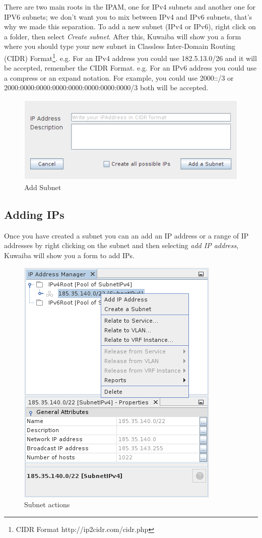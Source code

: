 \documentclass[a4paper]{article}
\begin{document}
		There are two main roots in the IPAM, one for IPv4 subnets and another one for IPV6 subnets; we don't want you to mix between IPv4 and IPv6 subnets, that's why we made this separation.  To add a new subnet (IPv4 or IPv6), right click on a folder, then select \textit{Create subnet}. After this, Kuwaiba will show you a form where you should type your new subnet in Classless Inter-Domain Routing (CIDR) Format\footnote{CIDR Format http://ip2cidr.com/cidr.php}.
		\newline e.g. For an IPv4 address you could use 182.5.13.0/26 and it will be accepted, remember the CIDR Format. 
		\newline e.g. For an IPv6 address you could use a compress or an expand notation. For example, you could use 2000::/3 or 2000:0000:0000:0000:0000:0000:0000:0000/3 both will be accepted.
		\begin{figure}[h!]
			\centering
			\includegraphics[width=0.5\linewidth]{img/ipam_add_subnet.png}
			\caption{Add Subnet}
			\label{fig:ipam_add_subnet}
		\end{figure}
		
		\subsection{Adding IPs}
		
		Once you have created a subnet you can an add an IP address or a range of IP addresses by right clicking on the subnet and then selecting \textit{add IP address}, Kuwaiba will show you a form to add IPs.
		\begin{figure}[h!]
			\centering
			\includegraphics[width=0.4\linewidth]{img/ipam_subnet_actions.png}
			\caption{Subnet actions}
			\label{fig:ipam_subnet_actions}
		\end{figure}
		
\end{document}

